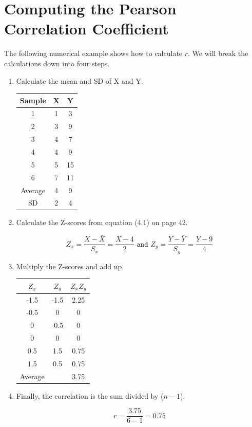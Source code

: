 \documentclass[11pt, chapterprefix=true]{scrbook}\usepackage[]{graphicx}\usepackage[]{color}
\begin{document}
\section{Computing the Pearson Correlation Coefficient}

The following numerical example shows how to calculate $r$.  We will break the calculations down into four steps.

\begin{enumerate}
\item Calculate the mean and SD of X and Y.

\begin{table}[ht]
\centering
\begin{tabular}{@{} ccc @{}} \hline
Sample & X & Y \\ \hline
1 & 1 & 3 \\
2 & 3 & 9 \\
3 & 4 & 7 \\
4 & 4 & 9 \\
5 & 5 & 15 \\
6 & 7 & 11 \\ \hline
Average & 4 & 9 \\
SD  & 2 & 4 \\ \hline
\end{tabular}
\end{table}

\item Calculate the Z-scores from equation (4.1) on page 42.  

$$ Z_x = \frac{X - \bar{X}}{S_x} = \frac{X - 4}{2} \texttt{ and } Z_y = \frac{Y - \bar{Y}}{S_y} = \frac{Y - 9}{4} $$

\item Multiply the Z-scores and add up.

\begin{table}[ht]
\centering
\begin{tabular}{@{} ccc @{}} \hline
$Z_x$ & $Z_y$ & $Z_x Z_y$ \\ \hline
-1.5 & -1.5 & 2.25 \\
-0.5 & 0 & 0 \\
0 & -0.5 & 0 \\
0 & 0 & 0 \\
0.5 & 1.5 & 0.75 \\
1.5 & 0.5 & 0.75 \\ \hline
Average &  & 3.75 \\
\end{tabular}
\end{table}

\item Finally, the correlation is the sum divided by ($n - 1$).

$$ r = \frac{3.75}{6 - 1} = 0.75 $$
\end{enumerate}
\end{document}
